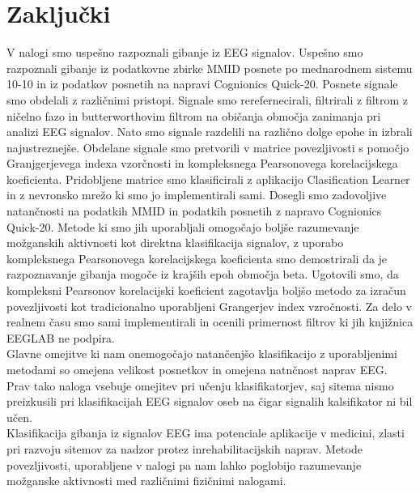 \chapter{Zaključki}
V nalogi smo uspešno razpoznali gibanje iz EEG signalov. Uspešno smo razpoznali gibanje iz podatkovne zbirke MMID posnete po mednarodnem sistemu 10-10 in iz podatkov posnetih na napravi Cognionics Quick-20. Posnete signale smo obdelali z različnimi pristopi. Signale smo rerefernecirali, filtrirali z filtrom z ničelno fazo in butterworthovim filtrom na običanja območja zanimanja pri analizi EEG signalov. Nato smo signale razdelili na različno dolge epohe in izbrali najustreznejše. Obdelane signale smo pretvorili v matrice povezljivosti s pomočjo Granjgerjevega indexa vzorčnosti in kompleksnega Pearsonovega korelacijskega koeficienta. Pridobljene matrice smo klasificirali z aplikacijo Clasification Learner in z nevronsko mrežo ki smo jo implementirali sami. Dosegli smo zadovoljive natančnosti na podatkih MMID in podatkih posnetih z napravo Cognionics Quick-20. Metode ki smo jih uporabljali omogočajo boljše razumevanje možganskih aktivnosti kot direktna klasifikacija signalov, z uporabo kompleksnega Pearsonovega korelacijskega koeficienta smo demostrirali da je razpoznavanje gibanja mogoče iz krajših epoh območja beta. Ugotovili smo, da kompleksni Pearsonov korelacijski koeficient zagotavlja boljšo metodo za izračun povezljivosti kot tradicionalno uporabljeni Grangerjev index vzročnosti. Za delo v realnem času smo sami implementirali in ocenili primernost filtrov ki jih knjižnica EEGLAB ne podpira.\\
Glavne omejitve ki nam onemogočajo natančenjšo klasifikacijo z uporabljenimi metodami so omejena velikost posnetkov in omejena natnčnost naprav EEG. Prav tako naloga vsebuje omejitev pri učenju klasifikatorjev, saj sitema nismo preizkusili pri klasifikacijah EEG signalov oseb na čigar signalih kalsifikator ni bil učen.\\
Klasifikacija gibanja iz signalov EEG ima potenciale aplikacije v medicini, zlasti pri razvoju sitemov za nadzor protez inrehabilitacijskih naprav. Metode povezljivosti, uporabljene v nalogi pa nam lahko poglobijo razumevanje možganske aktivnosti med različnimi fizičnimi nalogami.